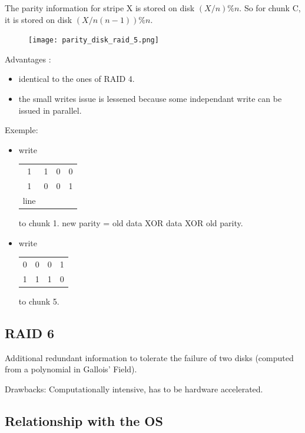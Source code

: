 \documentclass[a4paper,10pt]{report}
\begin{document}
The parity information for stripe X is stored on disk $(X/n)\%n$.
So for chunk C, it is stored on disk $(X/n(n-1))\%n$.

\begin{figure}[h!]
  \begin{center}
    \texttt{[image: parity\_disk\_raid\_5.png]}
    \caption{}
  \end{center}
\end{figure}


Advantages :

\begin{itemize}
  \item identical to the ones of RAID 4.
  \item the small writes issue is lessened because some independant write can be issued in parallel.
\end{itemize}

Exemple:

\begin{itemize}
  \item write
      \begin{tabular}{|cccc|}
      \hline
         1&1&0&0 \\
         1&0&0&1 \\
    line
      \end{tabular}
to chunk 1. new parity = old data XOR data XOR old parity.

\item write
      \begin{tabular}{|cccc|}
      \hline
         0&0&0&1 \\
         1&1&1&0 \\
      \hline
      \end{tabular}
to chunk 5. 
\end{itemize}

\subsection{RAID 6}

Additional redundant information to tolerate the failure of two disks (computed from a polynomial in Gallois' Field).

Drawbacks: Computationally intensive, has to be hardware accelerated.

\subsection{Relationship with the OS}
\end{document}
